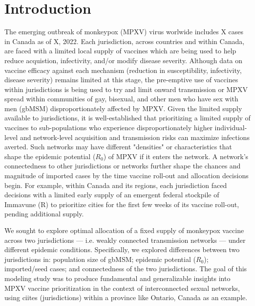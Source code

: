 \section{Introduction}
The emerging outbreak of monkeypox (MPXV) virus worlwide includes X cases in Canada as of X, 2022.
Each jurisdiction, across countries and within Canada, are faced with a limited local supply of vaccines 
which are being used to help reduce acquistion, infectivity, and/or modify disease severity. 
Although data on vaccine efficacy against each mechanism (reduction in susceptibility, infectivity, disease severity) 
remains limited at this stage, the pre-emptive use of vaccines within jurisdictions is being used to 
try and limit onward transmission or MPXV spread within communities of gay, bisexual, and other 
men who have sex with men (gbMSM) disproportionately affected by MPXV.
Given the limited supply available to jurisdictions, it is well-established that 
prioritizing a limited supply of vaccines
to sub-populations who experience disproportionately higher 
individual-level and network-level acquisition and transmission risks
can maximize infections averted. %
Such networks may have different "densities" or characteristics that shape 
the epidemic potential ($R_0$) of MPXV if it enters the network. A network's connectedness
to other jurisdictions or networks further shape the chances and magnitude of imported cases
by the time vaccine roll-out and allocation decisions begin. For example, within Canada and
its regions, each jurisdiction faced decisions with a limited early supply of an emergent federal 
stockpile of Immavune (R) %
to prioritize cities for the first few weeks of its vaccine roll-out, pending additional supply.
\par
We sought to explore optimal allocation of a fixed supply of monkeypox vaccine
across two jurisdictions --- i.e. weakly connected transmission networks ---
under different epidemic conditions.
Specifically, we explored differences between two jurisdictions in:
population size of gbMSM; epidemic potential ($R_0$); imported/seed cases;
and connectedness of the two jurisdictions. %
The goal of this modeling study was to produce fundamental and generalizable insights into 
MPXV vaccine prioritization in the context of interconnected sexual networks, using ciites (jurisdictions) 
within a province like Ontario, Canada as an example.
